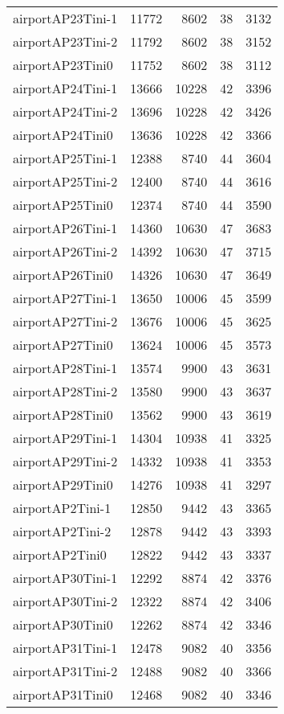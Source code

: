 \begin{longtable}{lrrrr}
airportAP23Tini-1 & 11772 & 8602 & 38 & 3132 \\
airportAP23Tini-2 & 11792 & 8602 & 38 & 3152 \\
airportAP23Tini0 & 11752 & 8602 & 38 & 3112 \\
airportAP24Tini-1 & 13666 & 10228 & 42 & 3396 \\
airportAP24Tini-2 & 13696 & 10228 & 42 & 3426 \\
airportAP24Tini0 & 13636 & 10228 & 42 & 3366 \\
airportAP25Tini-1 & 12388 & 8740 & 44 & 3604 \\
airportAP25Tini-2 & 12400 & 8740 & 44 & 3616 \\
airportAP25Tini0 & 12374 & 8740 & 44 & 3590 \\
airportAP26Tini-1 & 14360 & 10630 & 47 & 3683 \\
airportAP26Tini-2 & 14392 & 10630 & 47 & 3715 \\
airportAP26Tini0 & 14326 & 10630 & 47 & 3649 \\
airportAP27Tini-1 & 13650 & 10006 & 45 & 3599 \\
airportAP27Tini-2 & 13676 & 10006 & 45 & 3625 \\
airportAP27Tini0 & 13624 & 10006 & 45 & 3573 \\
airportAP28Tini-1 & 13574 & 9900 & 43 & 3631 \\
airportAP28Tini-2 & 13580 & 9900 & 43 & 3637 \\
airportAP28Tini0 & 13562 & 9900 & 43 & 3619 \\
airportAP29Tini-1 & 14304 & 10938 & 41 & 3325 \\
airportAP29Tini-2 & 14332 & 10938 & 41 & 3353 \\
airportAP29Tini0 & 14276 & 10938 & 41 & 3297 \\
airportAP2Tini-1 & 12850 & 9442 & 43 & 3365 \\
airportAP2Tini-2 & 12878 & 9442 & 43 & 3393 \\
airportAP2Tini0 & 12822 & 9442 & 43 & 3337 \\
airportAP30Tini-1 & 12292 & 8874 & 42 & 3376 \\
airportAP30Tini-2 & 12322 & 8874 & 42 & 3406 \\
airportAP30Tini0 & 12262 & 8874 & 42 & 3346 \\
airportAP31Tini-1 & 12478 & 9082 & 40 & 3356 \\
airportAP31Tini-2 & 12488 & 9082 & 40 & 3366 \\
airportAP31Tini0 & 12468 & 9082 & 40 & 3346 \\

\end{longtable}
